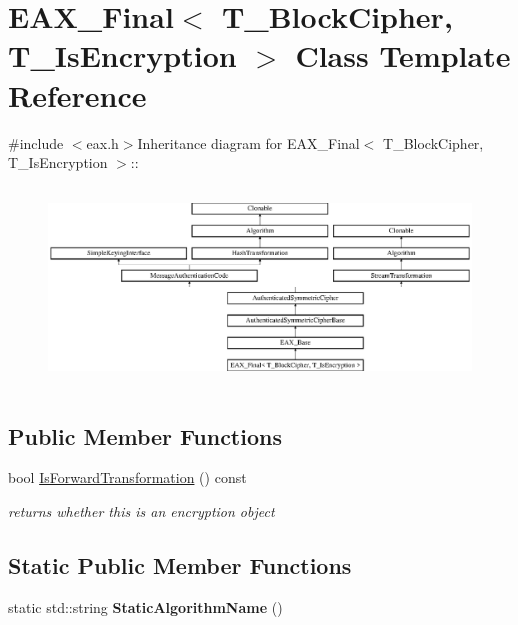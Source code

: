 \hypertarget{class_e_a_x___final}{
\section{EAX\_\-Final$<$ T\_\-BlockCipher, T\_\-IsEncryption $>$ Class Template Reference}
\label{class_e_a_x___final}
}


 


{\ttfamily \#include $<$eax.h$>$}Inheritance diagram for EAX\_\-Final$<$ T\_\-BlockCipher, T\_\-IsEncryption $>$::\begin{figure}[H]
\begin{center}
\leavevmode
\includegraphics[height=5.31435cm]{class_e_a_x___final}
\end{center}
\end{figure}
\subsection*{Public Member Functions}
\begin{DoxyCompactItemize}
\item 
\hypertarget{class_e_a_x___final_a6909864ba70b2dfae01d5f4bc1dde233}{
bool \hyperlink{class_e_a_x___final_a6909864ba70b2dfae01d5f4bc1dde233}{IsForwardTransformation} () const }
\label{class_e_a_x___final_a6909864ba70b2dfae01d5f4bc1dde233}

\begin{DoxyCompactList}\small\item\em returns whether this is an encryption object \item\end{DoxyCompactList}\end{DoxyCompactItemize}
\subsection*{Static Public Member Functions}
\begin{DoxyCompactItemize}
\item 
\hypertarget{class_e_a_x___final_a19e9657445ac1db4bcb369bf0b6b62e1}{
static std::string {\bfseries StaticAlgorithmName} ()}
\label{class_e_a_x___final_a19e9657445ac1db4bcb369bf0b6b62e1}

\end{DoxyCompactItemize}


